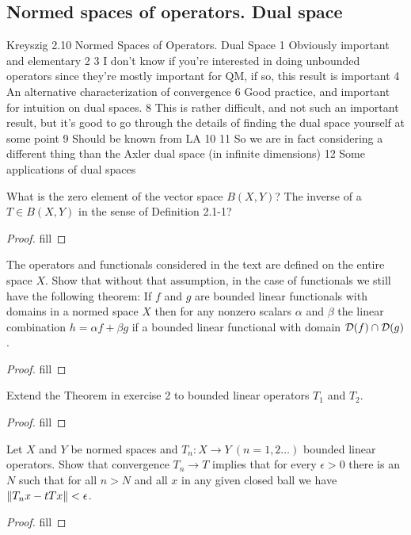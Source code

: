 \subsection{Normed spaces of operators. Dual space}

Kreyszig 2.10 Normed Spaces of Operators. Dual Space 
1 Obviously important and elementary 
2 
3 I don't know if you're interested in doing unbounded operators since they're mostly important for QM, if so, this result is important 
4 An alternative characterization of convergence
6 Good practice, and important for intuition on dual spaces.
8 This is rather difficult, and not such an important result, but it's good to go through the details of finding the dual space yourself at some point
9 Should be known from LA
10
11 So we are in fact considering a different thing than the Axler dual space (in infinite dimensions)
12 Some applications of dual spaces

\begin{exercise}{1}
What is the zero element of the vector space $B(X,Y)$?
The inverse of a $T\in B(X,Y)$ in the sense of Definition 2.1-1?
\end{exercise}
\begin{proof}
fill
\end{proof}

\begin{exercise}{2}
The operators and functionals considered in the text are defined on the entire space $X$.
Show that without that assumption, in the case of functionals we still have the following theorem:
If $f$ and $g$ are bounded linear functionals with domains in a normed space $X$ then for any nonzero scalars $\alpha$ and $\beta$ the linear combination $h=\alpha f+\beta g$ if a bounded linear functional with domain $\mathcal{D}(f)\cap\mathcal{D}(g)$.
\end{exercise}
\begin{proof}
fill
\end{proof}

\begin{exercise}{3}
Extend the Theorem in exercise 2 to bounded linear operators $T_1$ and $T_2$.
\end{exercise}
\begin{proof}
fill
\end{proof}

\begin{exercise}{4}
Let $X$ and $Y$ be normed spaces and $T_n:X\to Y\ (n=1,2\dots)$ bounded linear operators.
Show that convergence $T_n\to T$ implies that for every $\epsilon>0$ there is an $N$ such that for all $n>N$ and all $x$ in any given closed ball we have $\left\lVert T_nx-tTx\right\rVert<\epsilon$.
\end{exercise}
\begin{proof}
fill
\end{proof}

